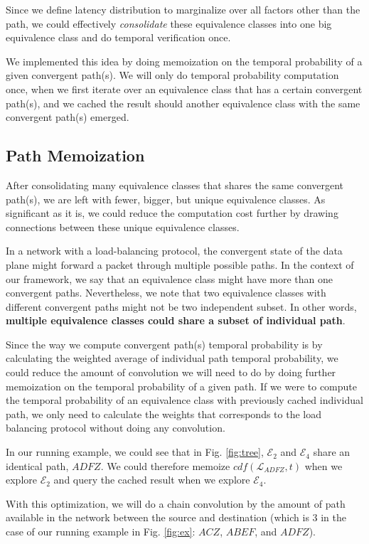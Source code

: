 Since we define latency distribution to marginalize over all factors other than the path, we could 
effectively \textit{consolidate} these equivalence classes into one big equivalence class and do temporal 
verification once.

We implemented this idea by doing memoization on the temporal probability of a given convergent path(s).
We will only do temporal probability computation once, when we first iterate over an equivalence class that 
has a certain convergent path(s), and we cached the result should another equivalence class with the same 
convergent path(s) emerged.

\subsection{Path Memoization}
After consolidating many equivalence classes that shares the same convergent path(s), we are left with fewer, 
bigger, but unique equivalence classes.
As significant as it is, we could reduce the computation cost further by drawing connections between these 
unique equivalence classes.

In a network with a load-balancing protocol, the convergent state of the data plane might forward a packet 
through multiple possible paths.
In the context of our framework, we say that an equivalence class might have more than one convergent paths.
Nevertheless, we note that two equivalence classes with different convergent paths might not be two 
independent subset.
In other words, \textbf{multiple equivalence classes could share a subset of individual path}.

Since the way we compute convergent path(s) temporal probability is by calculating the weighted average of 
individual path temporal probability, we could reduce the amount of convolution we will need to do by doing further memoization 
on the temporal probability of a given path.
If we were to compute the temporal probability of an equivalence class with previously cached individual 
path, we only need to calculate the weights that corresponds to the load balancing protocol without 
doing any convolution.

In our running example, we could see that in Fig. \ref{fig:tree}, $\mathcal{E}_2$ and $\mathcal{E}_4$ share 
an identical path, $ADFZ$.
We could therefore memoize $cdf(\mathcal{L}_{ADFZ}, t)$ when we explore $\mathcal{E}_2$ and query the 
cached result when we explore $\mathcal{E}_4$.

With this optimization, we will do a chain convolution by the amount of path available in the network between 
the source and destination (which is 3 in the case of our running example in Fig. \ref{fig:ex}: $ACZ$, $ABEF$, 
and $ADFZ$).

